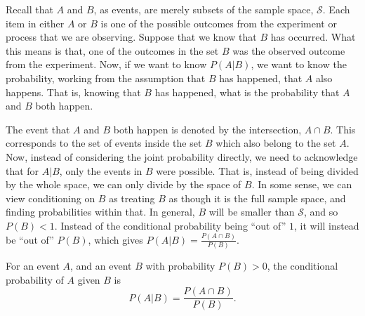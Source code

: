 \documentclass[
  letterpaper,
  DIV=11,
  numbers=noendperiod]{scrreprt}
\theoremstyle{definition}
\theoremstyle{definition}
\theoremstyle{definition}
\theoremstyle{remark}
\begin{document}
Recall that \(A\) and \(B\), as events, are merely subsets of the sample
space, \(\mathcal{S}\). Each item in either \(A\) or \(B\) is one of the
possible outcomes from the experiment or process that we are observing.
Suppose that we know that \(B\) has occurred. What this means is that,
one of the outcomes in the set \(B\) was the observed outcome from the
experiment. Now, if we want to know \(P(A|B)\), we want to know the
probability, working from the assumption that \(B\) has happened, that
\(A\) also happens. That is, knowing that \(B\) has happened, what is
the probability that \(A\) and \(B\) both happen.

The event that \(A\) and \(B\) both happen is denoted by the
intersection, \(A \cap B\). This corresponds to the set of events inside
the set \(B\) which also belong to the set \(A\). Now, instead of
considering the joint probability directly, we need to acknowledge that
for \(A|B\), only the events in \(B\) were possible. That is, instead of
being divided by the whole space, we can only divide by the space of
\(B\). In some sense, we can view conditioning on \(B\) as treating
\(B\) as though it is the full sample space, and finding probabilities
within that. In general, \(B\) will be smaller than \(\mathcal{S}\), and
so \(P(B) < 1\). Instead of the conditional probability being ``out of''
\(1\), it will instead be ``out of'' \(P(B)\), which gives
\(P(A|B) = \frac{P(A\cap B)}{P(B)}\).

\begin{tcolorbox}[enhanced jigsaw, rightrule=.15mm, leftrule=.75mm, opacitybacktitle=0.6, title={Computing Conditional Probabilities}, colframe=quarto-callout-tip-color-frame, opacityback=0, coltitle=black, breakable, toptitle=1mm, colbacktitle=quarto-callout-tip-color!10!white, bottomtitle=1mm, titlerule=0mm, arc=.35mm, colback=white, toprule=.15mm, left=2mm, bottomrule=.15mm]

For an event \(A\), and an event \(B\) with probability \(P(B) > 0\),
the conditional probability of \(A\) given \(B\) is
\[P(A|B) = \frac{P(A\cap B)}{P(B)}.\]

\end{tcolorbox}
\end{document}
